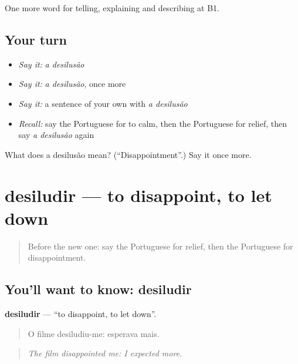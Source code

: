 \begin{grammarlens}[title={What you've built}]
One more word for telling, explaining and describing at B1.
\end{grammarlens}

\subsection*{Your turn}
\begin{itemize}
\raggedright
  \item \emph{Say it:} \emph{a desilusão}
  \item \emph{Say it:} \emph{a desilusão}, once more
  \item \emph{Say it:} a sentence of your own with \emph{a desilusão}
  \item \emph{Recall:} say the Portuguese for to calm, then the Portuguese for relief, then say \emph{a desilusão} again
\end{itemize}

\begin{tcolorbox}[breakable,colback=teal!4,colframe=teal!35!black,title={Before you move on}]
What does a desilusão mean? (\textquotedblleft{}Disappointment\textquotedblright{}.) Say it once more.
\end{tcolorbox}
\section[desiludir]{desiludir — to disappoint, to let down}

\label{lesson:PT-C476-desiludir}



\begin{quote}
Before the new one: say the Portuguese for relief, then the Portuguese for disappointment.
\end{quote}

\subsection*{You'll want to know: desiludir}
\textbf{desiludir} — \textquotedblleft{}to disappoint, to let down\textquotedblright{}.

\begin{quote}
O filme desiludiu-me: esperava mais.
\end{quote}

\begin{quote}
\emph{The film disappointed me: I expected more.}
\end{quote}

